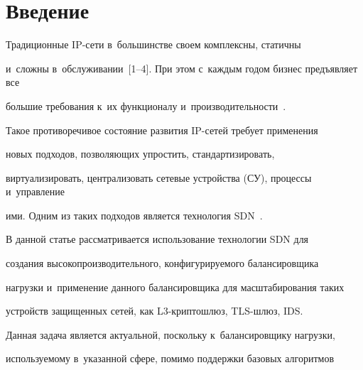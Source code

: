 















      \thispagestyle{headings}


      







\section{Введение}





  Традиционные IP-сети в~большинстве своем комплексны, статичны 


  и~сложны в~обслуживании~[1--4]. При этом с~каждым годом бизнес предъявляет все 


большие требования к~их функционалу и~производительности~\cite{5-sdn}. 


Такое противоречивое состояние развития IP-се\-тей требует применения 


новых подходов, поз\-во\-ля\-ющих упростить, стандартизировать, 


виртуализировать, централизовать сетевые устройства (СУ), процессы и~управление 


ими. Одним из таких подходов является технология SDN~\cite{2-sdn, 6-sdn}.


  


  В данной статье рассматривается использование технологии SDN для 


создания высокопроизводительного, конфигурируемого балансировщика 


нагрузки и~применение данного балансировщика для масштабирования таких 


устройств защищенных сетей, как L3-крип\-то\-шлюз, TLS-шлюз, IDS.


  


  Данная задача является актуальной, поскольку к~балансировщику нагрузки, 


используемому в~указанной сфере, помимо поддержки базовых алгоритмов 


